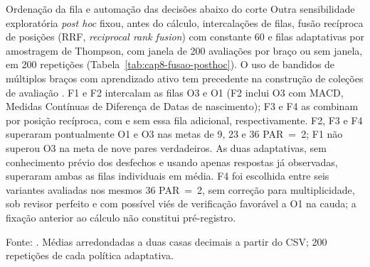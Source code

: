 \begin{chapter}{Ordenação da fila e automação das decisões abaixo do corte}
Outra sensibilidade exploratória \textit{post hoc} fixou, antes do cálculo, intercalações de filas, fusão recíproca de posições (RRF, \textit{reciprocal rank fusion}) com constante 60 e filas adaptativas por amostragem de Thompson, com janela de 200 avaliações por braço ou sem janela, em 200 repetições (Tabela~\ref{tab:cap8-fusao-posthoc}). O uso de bandidos de múltiplos braços com aprendizado ativo tem precedente na construção de coleções de avaliação \cite{Rahman2019bandits}. F1 e F2 intercalam as filas O3 e O1 (F2 inclui O3 com MACD, Medidas Contínuas de Diferença de Datas de nascimento); F3 e F4 as combinam por posição recíproca, com e sem essa fila adicional, respectivamente. F2, F3 e F4 superaram pontualmente O1 e O3 nas metas de 9, 23 e 36 PAR~=~2; F1 não superou O3 na meta de nove pares verdadeiros. As duas adaptativas, sem conhecimento prévio dos desfechos e usando apenas respostas já observadas, superaram ambas as filas individuais em média. F4 foi escolhida entre seis variantes avaliadas nos mesmos 36 PAR~=~2, sem correção para multiplicidade, sob revisor perfeito e com possível viés de verificação favorável a O1 na cauda; a fixação anterior ao cálculo não constitui pré-registro.

\begin{table}[!htbp]
\centering
\caption{Sensibilidade exploratória \textit{post hoc} da fusão de filas, sob revisor perfeito (recuperação de todo par verdadeiro revisado, sem falso positivo humano). O1 ordena pelo escore do OpenRecLink; O3, pela probabilidade calibrada na base inteira; MACD designa a variante de O3 acrescida de Medidas Contínuas de Diferença de Datas de nascimento. F1 e F2 intercalam filas; F3 e F4 usam fusão recíproca de posições (RRF), com constante 60. A1 e A2 usam amostragem de Thompson; apresentam-se médias e percentis 10 a 90 entre repetições, não intervalos de confiança.}
\label{tab:cap8-fusao-posthoc}
\small
{}
\par\footnotesize Fonte: . Médias arredondadas a duas casas decimais a partir do CSV; 200 repetições de cada política adaptativa.
\end{table}


\end{chapter}
